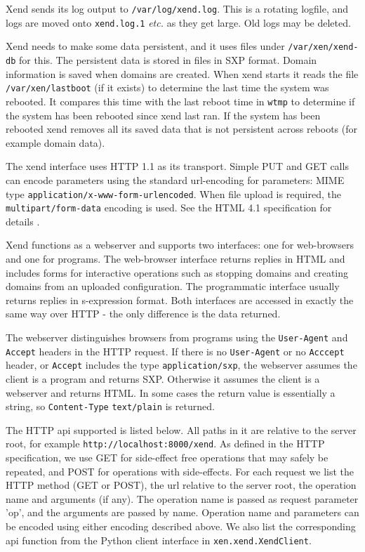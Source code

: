 \documentclass[11pt,twoside,final,openright]{xenstyle}
\begin{document}
Xend sends its log output to {\tt /var/log/xend.log}. This is a rotating logfile,
and logs are moved onto {\tt xend.log.1} {\it etc.} as they get large. Old logs may
be deleted.

Xend needs to make some data persistent, and it uses files under {\tt /var/xen/xend-db}
for this. The persistent data is stored in files in SXP format. Domain information
is saved when domains are created. When xend starts it reads the file {\tt /var/xen/lastboot}
(if it exists) to determine the last time the system was rebooted. It compares this time
with the last reboot time in {\tt wtmp} to determine if the system has been rebooted
since xend last ran. If the system has been rebooted xend removes all its saved data
that is not persistent across reboots (for example domain data).

 The xend interface uses HTTP 1.1 \cite{http} as its transport.
Simple PUT and GET calls can encode parameters using the standard url-encoding 
for parameters: MIME type {\tt application/x-www-form-urlencoded}.
When file upload is required, the {\tt multipart/form-data} encoding is used.
See the HTML 4.1 specification for details \cite{html}.

Xend functions as a webserver and supports two interfaces: one
for web-browsers and one for programs.
The web-browser interface returns replies in HTML and includes forms
for interactive operations such as stopping domains and creating domains
from an uploaded configuration. The programmatic interface usually returns replies
in s-expression format. Both interfaces are accessed
in exactly the same way over HTTP - the only difference is the data returned.

The webserver distinguishes browsers from programs using the {\tt User-Agent}
and {\tt Accept} headers in the HTTP request. If there is no {\tt User-Agent} or no
{\tt Acccept} header, or {\tt Accept} includes the type {\tt application/sxp}, the
webserver assumes the client is a program and returns SXP. Otherwise
it assumes the client is a webserver and returns HTML.
In some cases the return value is essentially a string, so {\tt Content-Type}
{\tt text/plain} is returned.

The HTTP api supported is listed below. All paths in it are relative to the
server root, for example {\tt http://localhost:8000/xend}.
As defined in the HTTP specification, we use GET for side-effect free
operations that may safely be repeated, and POST for operations with
side-effects. For each request we list the HTTP method (GET or POST),
the url relative to the server root, the operation name and arguments (if any).
The operation name is passed as request parameter 'op', and the arguments
are passed by name. Operation name and parameters can be encoded using either
encoding described above. We also list the corresponding api function from the
Python client interface in {\tt xen.xend.XendClient}.
\end{document}

